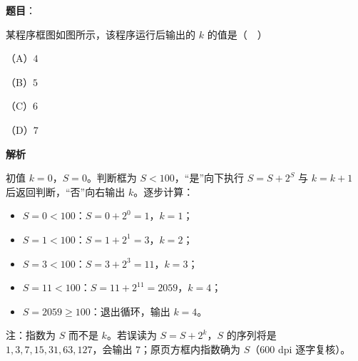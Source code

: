 \begin{answer}

\textbf{题目}：

某程序框图如图所示，该程序运行后输出的 $k$ 的值是（　）

（A）$4$

（B）$5$

（C）$6$

（D）$7$
\nopagebreak[4]
\begin{center}\end{center}
\nopagebreak[4]
\textbf{解析}

初值 $k=0$，$S=0$。判断框为 $S<100$，“是”向下执行 $S=S+2^S$ 与 $k=k+1$ 后返回判断，“否”向右输出 $k$。逐步计算：

\begin{itemize}
\item $S=0<100$：$S=0+2^0=1$，$k=1$；
\item $S=1<100$：$S=1+2^1=3$，$k=2$；
\item $S=3<100$：$S=3+2^3=11$，$k=3$；
\item $S=11<100$：$S=11+2^{11}=2059$，$k=4$；
\item $S=2059\geqslant100$：退出循环，输出 $k=4$。
\end{itemize}

注：指数为 $S$ 而不是 $k$。若误读为 $S=S+2^k$，$S$ 的序列将是 $1,3,7,15,31,63,127$，会输出 $7$；原页方框内指数确为 $S$（600 dpi 逐字复核）。


\end{answer}
